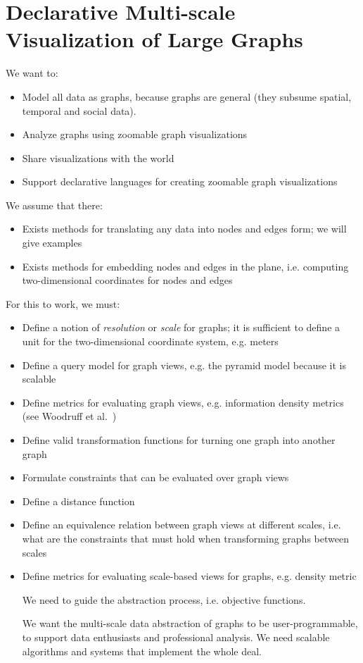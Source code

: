 \chapter{Declarative Multi-scale Visualization of Large Graphs}


We want to:
\begin{itemize}
\item Model all data as graphs, because graphs are general (they subsume spatial, temporal and social data). 
\item Analyze graphs using zoomable graph visualizations
\item Share visualizations with the world
\item Support declarative languages for creating zoomable graph visualizations
\end{itemize}

We assume that there:

\begin{itemize}
\item Exists methods for translating any data into nodes and edges form; we will give examples
\item Exists methods for embedding nodes and edges in the plane, i.e. computing two-dimensional coordinates for nodes and edges
\end{itemize}

For this to work, we must:
\begin{itemize}
\item Define a notion of \emph{resolution} or \emph{scale} for graphs; it is sufficient to define a unit for the two-dimensional coordinate system, e.g. meters
\item Define a query model for graph views, e.g. the pyramid model because it is scalable
\item Define metrics for evaluating graph views, e.g. information density metrics (see Woodruff et al.~\cite{woodruff1998constant})
\item Define valid transformation functions for turning one graph into another graph

\item Formulate constraints that can be evaluated over graph views
\item Define a distance function 
\item Define an equivalence relation between graph views at different scales, i.e. what are the constraints that must hold when transforming graphs between scales

\item Define metrics for evaluating scale-based views for graphs, e.g. density metric


We need to guide the abstraction process, i.e. objective functions. 

We want the multi-scale data abstraction of graphs to be user-programmable, to support data enthusiasts and professional analysis. We need scalable algorithms and systems that implement the whole deal.

\end{itemize}

